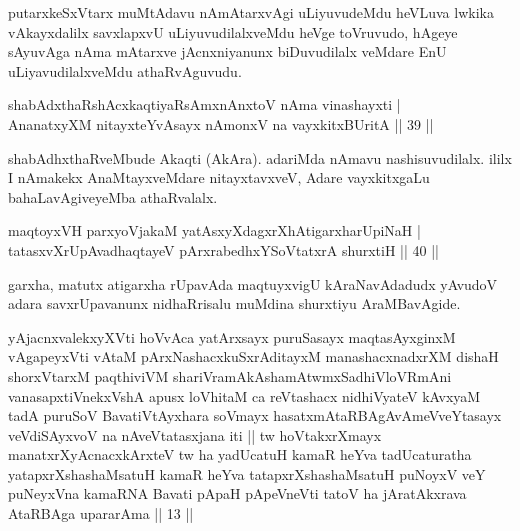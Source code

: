 \begin{artha}
putarxkeSxVtarx muMtAdavu nAmAtarxvAgi uLiyuvudeMdu heVLuva lwkika vAkayxdalilx savxlapxvU uLiyuvudilalxveMdu heVge toVruvudo, hAgeye sAyuvAga nAma mAtarxve jAcnxniyanunx biDuvudilalx veMdare EnU uLiyavudilalxveMdu athaRvAguvudu.
\end{artha}


\begin{shl}
shabAdxthaRshAcx\s \s kaqtiyaRsAmxnAnxtoV nAma vinashayxti |\\
AnanatxyXM nitayxteYvAsayx nAmonxV na vayxkitxBUritA \hfill || 39 ||
\end{shl}

\begin{artha}
shabAdhxthaRveMbude Akaqti (AkAra). adariMda nAmavu nashisuvudilalx. ililx I nAmakekx AnaMtayxveMdare nitayxtavxveV, Adare vayxkitxgaLu bahaLavAgiveyeMba athaRvalalx.
\end{artha}


\begin{shl}
maqtoyxVH parxyoVjakaM yatAsxyXdagxrXhAtigarxharUpiNaH |\\
tatasxvXrUpAvadhaqtayeV pArxrabedhxYSoVtatxrA shurxtiH \hfill || 40 ||
\end{shl}

\begin{artha}
garxha, matutx atigarxha rUpavAda maqtuyxvigU kAraNavAdadudx yAvudoV adara savxrUpavanunx nidhaRrisalu muMdina shurxtiyu AraMBavAgide.
\end{artha}


\begin{kandikeshl}
yAjacnxvalekxyXVti hoVvAca yatArxsayx puruSasayx maqtasAyxginxM vAgapeyxVti vAtaM pArxNashacxkuSxrAditayxM manashacxnadxrXM dishaH shorxVtarxM paqthiviVM shariVramAkAshamAtwmxSadhiVloVRmAni vanasapxtiVnekxVshA apusx loVhitaM ca reVtashacx nidhiVyateV kAvxyaM tadA puruSoV BavatiVtAyxhara soVmayx hasatxmAtaRBAgAvAmeVveYtasayx veVdiSAyxvoV na nAveVtatasxjana iti || tw hoVtakxrXmayx manatxrXyAcnacxkArxteV tw ha yadUcatuH kamaR heYva tadUcaturatha yatapxrXshashaMsatuH kamaR heYva tatapxrXshashaMsatuH puNoyxV veY puNeyxVna kamaRNA Bavati pApaH pApeVneVti tatoV ha jAratAkxrava AtaRBAga upararAma || 13 ||
\end{kandikeshl}

